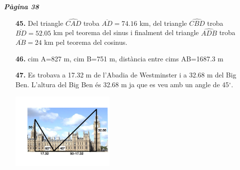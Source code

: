 \documentclass[a4paper, pdf, twoside]{book}
\begin{document}
\begin{multicols}{2}
{\textbf{\em Pàgina 38}} \hrulefill
\begin{enumerate}
\vspace{0.25cm}
\item[\fontfamily{phv}\selectfont\color{blue}\textbf{45. }]  \scalebox{0.6}{\simbolcompass } 
Del triangle $\widehat {CAD}$ troba $\overline {AD}=74.16$ km, del triangle $\widehat {CBD}$ troba $\overline {BD}=52.05$ km pel teorema del sinus i finalment del triangle $\widehat {ADB}$ troba $\overline {AB}=24$ km pel teorema del cosinus.
 \end{enumerate}
\begin{enumerate}
\vspace{0.25cm}
\item[\fontfamily{phv}\selectfont\color{blue}\textbf{46. }]  \scalebox{0.6}{\simbolclau } 
cim A=827 m, cim B=751 m, distància entre cims AB=1687.3 m
\vspace{0.25cm}
\item[\fontfamily{phv}\selectfont\color{blue}\textbf{47. }] 
Es trobava a 17.32 m de l'Abadia de Westminster i a 32.68 m del Big Ben. L'altura del Big Ben és 32.68 m ja que es veu amb un angle de 45$^\circ $. \par \includegraphics [width=0.4\textwidth ]{img-sol/t3-47}
 \end{enumerate}
\vspace{0.3cm}



\end{multicols}
\end{document}
